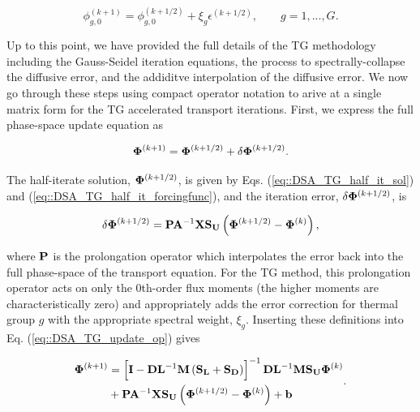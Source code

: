 \begin{equation}
\label{eq::DSA_TG_err_update}
 \phi_{g,0}^{(k+1)} =  \phi_{g,0}^{(k+1/2)}  + \xi_g \epsilon^{(k+1/2)}, \qquad g=1,...,G .
\end{equation}

Up to this point, we have provided the full details of the TG methodology including the Gauss-Seidel iteration equations, the process to spectrally-collapse the diffusive error, and the addiditve interpolation of the diffusive error. We now go through these steps using compact operator notation to arive at a single matrix form for the TG accelerated transport iterations. First, we express the full phase-space update equation as 

\begin{equation}
\label{eq::DSA_TG_update_op}
 {\bf \Phi}^{(k+1)} =  {\bf \Phi}^{(k+1/2)}  + \delta {\bf \Phi}^{(k+1/2)} .
\end{equation}

\noindent The half-iterate solution, ${\bf \Phi}^{(k+1/2)}$, is given by Eqs. (\ref{eq::DSA_TG_half_it_sol}) and (\ref{eq::DSA_TG_half_it_forcingfunc}), and the iteration error, $\delta {\bf \Phi}^{(k+1/2)}$, is 

\begin{equation}
\label{eq::DSA_TG_proj_err}
\delta {\bf \Phi}^{(k+1/2)} =  {\bf P} {\bf A}^{-1}  {\bf X} {\bf S_{U}} \left(  {\bf \Phi}^{(k+1/2)} - {\bf \Phi}^{(k)}  \right),
\end{equation}

\noindent where ${\bf P}$ is the prolongation operator which interpolates the error back into the full phase-space of the transport equation. For the TG method, this prolongation operator acts on only the 0th-order flux moments (the higher moments are characteristically zero) and appropriately adds the error correction for thermal group $g$ with the appropriate spectral weight, $\xi_g$. Inserting these definitions into Eq. (\ref{eq::DSA_TG_update_op}) gives

\begin{equation}
\label{eq::DSA_TG_op_update_w_fullterms}
\begin{aligned}
 {\bf \Phi}^{(k+1)} &=  \left[ {\bf I} - {\bf D}{\bf L}^{-1} {\bf M} \left(  {\bf S_L} + {\bf S_D} \right) \right]^{-1} {\bf D}{\bf L}^{-1}  {\bf M} {\bf S_U} {\bf \Phi}^{(k)} \\
  &+  {\bf P} {\bf A}^{-1}  {\bf X} {\bf S_{U}} \left(  {\bf \Phi}^{(k+1/2)} - {\bf \Phi}^{(k)}  \right) + {\bf b}
\end{aligned} .
\end{equation}

